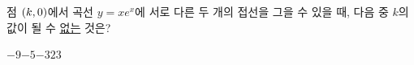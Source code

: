 점 $(k{,}\mkern3mu\mathopen{}0)$에서 곡선 $y=xe^x$에 서로 다른 두 개의 접선을 그을 수 있을 때, 다음 중 $k$의 값이 될 수 \underline{없는} 것은?
\begin{choices32}{$-9$}{$-5$}{$-3$}{$2$}{$3$}\end{choices32}
